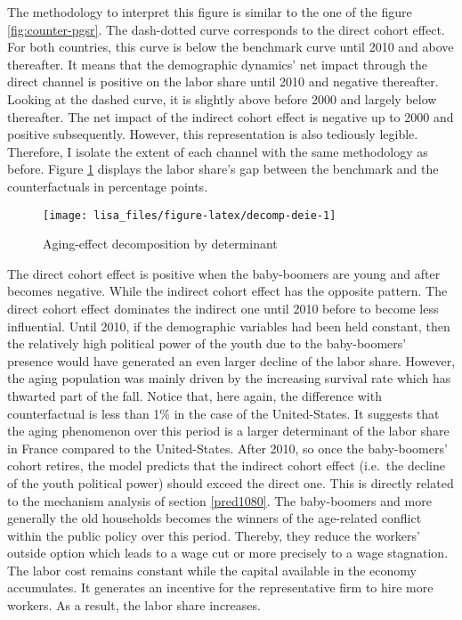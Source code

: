 \documentclass[
]{article}
\begin{document}
The methodology to interpret this figure is similar to the one of the figure \ref{fig:counter-pgsr}. The dash-dotted curve corresponds to the direct cohort effect. For both countries, this curve is below the benchmark curve until 2010 and above thereafter. It means that the demographic dynamics' net impact through the direct channel is positive on the labor share until 2010 and negative thereafter. Looking at the dashed curve, it is slightly above before 2000 and largely below thereafter. The net impact of the indirect cohort effect is negative up to 2000 and positive subsequently. However, this representation is also tediously legible. Therefore, I isolate the extent of each channel with the same methodology as before. Figure \ref{fig:decomp-deie} displays the labor share's gap between the benchmark and the counterfactuals in percentage points.

\begin{figure}[!tb]

{\centering \texttt{[image: lisa\_files/figure-latex/decomp-deie-1]} 

}

\caption{Aging-effect decomposition by determinant}\label{fig:decomp-deie}
\end{figure}

The direct cohort effect is positive when the baby-boomers are young and after becomes negative. While the indirect cohort effect has the opposite pattern. The direct cohort effect dominates the indirect one until 2010 before to become less influential. Until 2010, if the demographic variables had been held constant, then the relatively high political power of the youth due to the baby-boomers' presence would have generated an even larger decline of the labor share. However, the aging population was mainly driven by the increasing survival rate which has thwarted part of the fall. Notice that, here again, the difference with counterfactual is less than 1\% in the case of the United-States. It suggests that the aging phenomenon over this period is a larger determinant of the labor share in France compared to the United-States.
After 2010, so once the baby-boomers' cohort retires, the model predicts that the indirect cohort effect (i.e.~the decline of the youth political power) should exceed the direct one. This is directly related to the mechanism analysis of section \ref{pred1080}. The baby-boomers and more generally the old households becomes the winners of the age-related conflict within the public policy over this period. Thereby, they reduce the workers' outside option which leads to a wage cut or more precisely to a wage stagnation. The labor cost remains constant while the capital available in the economy accumulates. It generates an incentive for the representative firm to hire more workers. As a result, the labor share increases.
\end{document}
